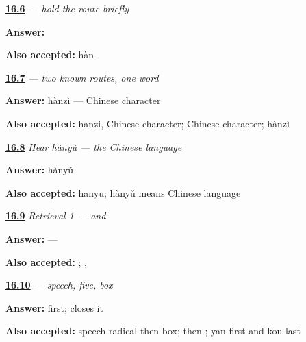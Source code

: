 \noindent\begin{minipage}[t]{\linewidth}
\raggedright
\hyperlink{review-ZH-W16-han-delayed-check}{\textbf{16.6}} \emph{ — hold the route briefly}\par
\small \textbf{Answer:} \par
\footnotesize \textbf{Also accepted:}  hàn
\end{minipage}\par\medskip

\noindent\begin{minipage}[t]{\linewidth}
\raggedright
\hyperlink{review-ZH-C16-hanzi-read}{\textbf{16.7}} \emph{ — two known routes, one word}\par
\small \textbf{Answer:} hànzì — Chinese character\par
\footnotesize \textbf{Also accepted:} hanzi, Chinese character; Chinese character; hànzì
\end{minipage}\par\medskip

\noindent\begin{minipage}[t]{\linewidth}
\raggedright
\hyperlink{review-ZH-C16-hear-hanyu-meaning}{\textbf{16.8}} \emph{Hear \emph{hànyǔ} — the Chinese language}\par
\small \textbf{Answer:} hànyǔ\par
\footnotesize \textbf{Also accepted:} hanyu; hànyǔ means Chinese language
\end{minipage}\par\medskip

\noindent\begin{minipage}[t]{\linewidth}
\raggedright
\hyperlink{review-ZH-R16-identity-1-recall}{\textbf{16.9}} \emph{Retrieval 1 —  and }\par
\small \textbf{Answer:}  — \par
\footnotesize \textbf{Also accepted:}  ; , 
\end{minipage}\par\medskip

\noindent\begin{minipage}[t]{\linewidth}
\raggedright
\hyperlink{review-ZH-W16-yu-observe-order}{\textbf{16.10}} \emph{ — speech, five, box}\par
\small \textbf{Answer:}  first;  closes it\par
\footnotesize \textbf{Also accepted:} speech radical then box;  then ; yan first and kou last
\end{minipage}\par\medskip


